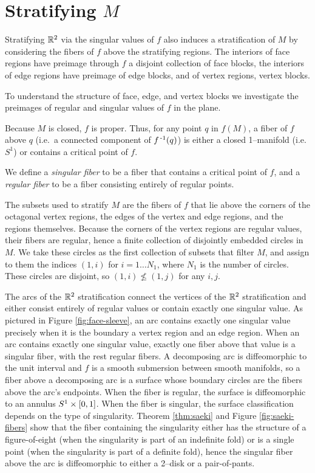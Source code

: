 \section{Stratifying $M$}

Stratifying $\mathbb{R}^2$ via the singular values of $f$ also induces a stratification of $M$
by considering the fibers of $f$ above the stratifying regions.
The interiors of face regions have preimage through $f$ a disjoint collection of face blocks, the interiors of edge regions have preimage of edge blocks, and of vertex regions, vertex blocks.

To understand the structure of face, edge, and vertex blocks we investigate the preimages of regular and singular values of $f$ in the plane.
\begin{defn}
	Because $M$ is closed, $f$ is proper.
	Thus, for any point $q$ in $f(M)$, a fiber of $f$ above $q$ (i.e.\ a connected component of $f^{\,\text{-}1}(q)$) is either a closed 1--manifold (i.e.\ $S^1$) or contains a critical point of $f$.
	
	We define a \emph{singular fiber} to be a fiber that contains a critical point of $f$, and a \emph{regular fiber} to be a fiber consisting entirely of regular points.	
\end{defn}

The subsets used to stratify $M$ are the fibers of $f$ that lie above the corners of the octagonal vertex regions, the edges of the vertex and edge regions, and the regions themselves.
Because the corners of the vertex regions are regular values, their fibers are regular, hence a finite collection of disjointly embedded circles in $M$.
We take these circles as the first collection of subsets that filter $M$, and assign to them the indices $(1,i)$ for $i = 1\dots N_1$, where $N_1$ is the number of circles.
These circles are disjoint, so $(1,i)\nleq (1,j)$ for any $i,j$.

The arcs of the $\mathbb{R}^2$ stratification connect the vertices of the $\mathbb{R}^2$ stratification and either consist entirely of regular values or contain exactly one singular value.
As pictured in Figure \ref{fig:face-sleeve}, an arc contains exactly one singular value precisely when it is the boundary a vertex region and an edge region.
When an arc contains exactly one singular value, exactly one fiber above that value is a singular fiber, with the rest regular fibers.
A decomposing arc is diffeomorphic to the unit interval and $f$ is a smooth submersion between smooth manifolds, so a fiber above a decomposing arc is a surface whose boundary circles are the fibers above the arc's endpoints.
When the fiber is regular, the surface is diffeomorphic to an annulus $S^1\times[0,1]$.
When the fiber is singular, the surface classification depends on the type of singularity.
Theorem \ref{thm:saeki} and Figure \ref{fig:saeki-fibers} show that the fiber containing the singularity either has the structure of a figure-of-eight (when the singularity is part of an indefinite fold) or is a single point (when the singularity is part of a definite fold), hence the singular fiber above the arc is diffeomorphic to either a 2--disk or a pair-of-pants.

